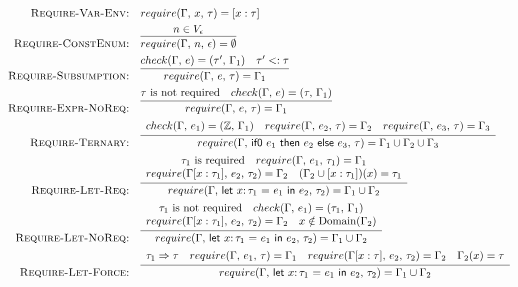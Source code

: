 \documentclass[peerreview, 10pt]{IEEEtran}
\newcommand{\Z}{\ensuremath{\mathbb{Z}}}
\newcommand{\lett}[4]{\ensuremath{\mathsf{let}\ #1\mathsf{:}\,#2\ \mathsf{=}\ #3\ \mathsf{in}\ #4}}
\newcommand{\ternary}[3]{\ensuremath{\mathsf{if0}\ #1\ \mathsf{then}\ #2\ \mathsf{else}\ #3}}
\newcommand{\checktype}[4]{\ensuremath{{check}(#1,\,#2)=(#3,\,#4)}}
\newcommand{\requiretype}[4]{\ensuremath{{require}(#1,\,#2,\,#3)=#4}}
\newcommand{\required}[1]{\ensuremath{#1\text{ is required}}}
\newcommand{\nrequired}[1]{\ensuremath{#1\text{ is not required}}}
\newcommand{\forcerequire}[2]{\ensuremath{#1\Rightarrow#2}}
\begin{document}
\begin{figure*}[ht]
\centering
\begin{framed}
\begin{align*}
\text{\textsc{Require-Var-Env:}} &\quad \requiretype{\Gamma}{x}{\tau}{[x:\tau]} \\
\text{\textsc{Require-ConstEnum:}} &\quad \infer{\requiretype{\Gamma}{n}{\epsilon}{\emptyset}}{n \in V_\epsilon} \\
\text{\textsc{Require-Subsumption:}} &\quad \infer{\requiretype{\Gamma}{e}{\tau}{\Gamma_1}}{\checktype{\Gamma}{e}{\tau'}{\Gamma_1} \quad \tau' <: \tau} \\
\text{\textsc{Require-Expr-NoReq:}} &\quad \infer{\requiretype{\Gamma}{e}{\tau}{\Gamma_1}}{\nrequired{\tau} \quad \checktype{\Gamma}{e}{\tau}{\Gamma_1}} \\
\text{\textsc{Require-Ternary:}} &\quad \infer{\requiretype{\Gamma}{\ternary{e_1}{e_2}{e_3}}{\tau}{\Gamma_1\cup \Gamma_2 \cup \Gamma_3}}{
\begin{array}{c}
\checktype{\Gamma}{e_1}{\Z}{\Gamma_1} \quad
\requiretype{\Gamma}{e_2}{\tau}{\Gamma_2} \quad \requiretype{\Gamma}{e_3}{\tau}{\Gamma_3}
\end{array}
} \\
\text{\textsc{Require-Let-Req:}} &\quad \infer{\requiretype{\Gamma}{\lett{x}{\tau_1}{e_1}{e_2}}{\tau_2}{\Gamma_1 \cup \Gamma_2}}{
\begin{array}{c}
\required{\tau_1} \quad \requiretype{\Gamma}{e_1}{\tau_1}{\Gamma_1} \\
\requiretype{\Gamma[x:\tau_1]}{e_2}{\tau_2}{\Gamma_2}\quad
(\Gamma_2\cup[x:\tau_1])(x)=\tau_1
\end{array}
} \\
\text{\textsc{Require-Let-NoReq:}} &\quad \infer{\requiretype{\Gamma}{\lett{x}{\tau_1}{e_1}{e_2}}{\tau_2}{\Gamma_1 \cup \Gamma_2}}{
\begin{array}{c}
\nrequired{\tau_1} \quad \checktype{\Gamma}{e_1}{\tau_1}{\Gamma_1} \\
\requiretype{\Gamma[x:\tau_1]}{e_2}{\tau_2}{\Gamma_2} \quad x \notin \text{Domain}(\Gamma_2)
\end{array}
} \\
\text{\textsc{Require-Let-Force:}} &\quad \infer{\requiretype{\Gamma}{\lett{x}{\tau_1}{e_1}{e_2}}{\tau_2}{\Gamma_1 \cup \Gamma_2}}{
\begin{array}{c}
\forcerequire{\tau_1}{\tau} \quad \requiretype{\Gamma}{e_1}{\tau}{\Gamma_1} \quad
\requiretype{\Gamma[x:\tau]}{e_2}{\tau_2}{\Gamma_2} \quad \Gamma_2(x) = \tau

\end{array}}
\end{align*}
\end{framed}
\end{figure*}
\end{document}
